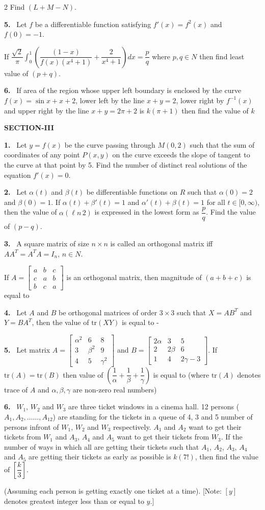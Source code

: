 \documentclass[10pt]{extarticle}
\newcommand{\sect}[1]{\par\smallskip\noindent\textbf{#1}\par}
\newcommand{\qn}[1]{\par\smallskip\noindent\textbf{#1.}~}
\begin{document}
\begin{multicols}{2}
Find $(L+M-N)$.
\qn{5} Let $f$ be a differentiable function satisfying $f'(x)=f^2(x)$ and $f(0)=-1$.\par
If $\dfrac{\sqrt2}{\pi}\displaystyle\int_0^1\left(\dfrac{(1-x)}{f(x)(x^4+1)}+\dfrac{2}{x^4+1}\right)dx=\dfrac pq$ where $p,q\in N$ then find least value of $(p+q)$.
\qn{6} If area of the region whose upper left boundary is enclosed by the curve $f(x)=\sin x+x+2$, lower left by the line $x+y=2$, lower right by $f^{-1}(x)$ and upper right by the line $x+y=2\pi+2$ is $k(\pi+1)$ then find the value of $k$
\sect{SECTION-III}
\qn{1} Let $y=f(x)$ be the curve passing through $M(0,2)$ such that the sum of coordinates of any point $P(x,y)$ on the curve exceeds the slope of tangent to the curve at that point by 5. Find the number of distinct real solutions of the equation $f'(x)=0$.
\qn{2} Let $\alpha(t)$ and $\beta(t)$ be differentiable functions on $R$ such that $\alpha(0)=2$ and $\beta(0)=1$. If $\alpha(t)+\beta'(t)=1$ and $\alpha'(t)+\beta(t)=1$ for all $t\in[0,\infty)$, then the value of $\alpha(\ell n\,2)$ is expressed in the lowest form as $\dfrac pq$. Find the value of $(p-q)$.
\qn{3} A square matrix of size $n\times n$ is called an orthogonal matrix iff $AA^T=A^TA=I_n$, $n\in N$.\par
If $A=\begin{bmatrix}a&b&c\\c&a&b\\b&c&a\end{bmatrix}$ is an orthogonal matrix, then magnitude of $(a+b+c)$ is equal to
\qn{4} Let $A$ and $B$ be orthogonal matrices of order $3\times3$ such that $X=AB^T$ and $Y=BA^T$, then the value of $\text{tr}(XY)$ is equal to -
\qn{5} Let matrix $A=\begin{bmatrix}\alpha^2&6&8\\3&\beta^2&9\\4&5&\gamma^2\end{bmatrix}$ and $B=\begin{bmatrix}2\alpha&3&5\\2&2\beta&6\\1&4&2\gamma-3\end{bmatrix}$. If $\text{tr}(A)=\text{tr}(B)$ then value of $\left(\dfrac1\alpha+\dfrac1\beta+\dfrac1\gamma\right)$ is equal to (where $\text{tr}(A)$ denotes trace of $A$ and $\alpha,\beta,\gamma$ are non-zero real numbers)
\qn{6} $W_1$, $W_2$ and $W_3$ are three ticket windows in a cinema hall. 12 persons ($A_1,A_2,\ldots\ldots,A_{12}$) are standing for the tickets in a queue of 4, 3 and 5 number of persons infront of $W_1$, $W_2$ and $W_3$ respectively. $A_1$ and $A_2$ want to get their tickets from $W_1$ and $A_3$, $A_4$ and $A_5$ want to get their tickets from $W_3$. If the number of ways in which all are getting their tickets such that $A_1$, $A_2$, $A_3$, $A_4$ and $A_5$ are getting their tickets as early as possible is $k(7!)$, then find the value of $\left[\dfrac k3\right]$.\par
(Assuming each person is getting exactly one ticket at a time).
[Note: $[y]$ denotes greatest integer less than or equal to $y$.]
\end{multicols}
\end{document}
